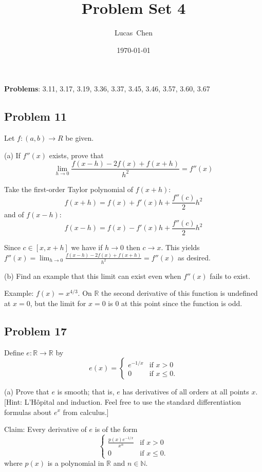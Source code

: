 \documentclass{amsart}
\title{Problem Set 4}
\author{Lucas\ Chen}
\date{\today}
\begin{document}
\maketitle

\textbf{Problems}: 3.11, 3.17, 3.19, 3.36, 3.37, 3.45, 3.46, 3.57, 3.60, 3.67

\subsection*{Problem 11} Let $f:(a, b)\rightarrow R$ be given.

\medskip \noindent 

(a) If $f''(x)$ exists, prove that
\[\lim_{h\rightarrow 0}\frac{f(x-h)-2f(x)+f(x+h)}{h^2} =f''(x)\]

\medskip \noindent Take the first-order Taylor polynomial of $f(x+h)$: 
\[f(x+h)=f(x)+f'(x)h+\frac{f''(c)}{2}h^2\]
and of $f(x-h)$:
\[f(x-h)=f(x)-f'(x)h+\frac{f''(c)}{2}h^2\]

Since $c\in [x, x+h]$ we have if $h\rightarrow 0$ then $c\rightarrow x$. This yields 
$f''(x)= \lim_{h\rightarrow 0}\frac{f(x-h)-2f(x)+f(x+h)}{h^2} =f''(x)$ as desired.
\bigskip

(b) Find an example that this limit can exist even when $f''(x)$ fails to exist.

\medskip \noindent Example: $f(x) = x^{4/3}$. On $\mathbb{R}$ the second derivative of this function
is undefined at $x=0$, but the limit for $x=0$ is $0$ at this point since the function is odd.

\newpage

\subsection*{Problem 17} Define $e: \mathbb{R}\rightarrow\mathbb{R}$ by
\[e(x) = \begin{cases}
		e^{-1/x} & \text{if } x>0\\
		0 & \text{if } x\leq 0.
\end{cases}\]

(a) Prove that $e$ is smooth; that is, $e$ has derivatives of all orders at
all points $x$.[Hint: L'H\^{o}pital and induction. Feel free to use the standard differentiation
formulas about $e^x$ from calculus.]

\medskip \noindent Claim: Every derivative of $e$ is of the form \[\begin{cases}
	\frac{p(x)e^{-1/x}}{x^n} & \text{if } x>0\\
	0 & \text{if } x\leq 0.
\end{cases}\]
where $p(x)$ is a polynomial in $\mathbb{R}$ and $n\in\mathbb{N}$.
\end{document}
